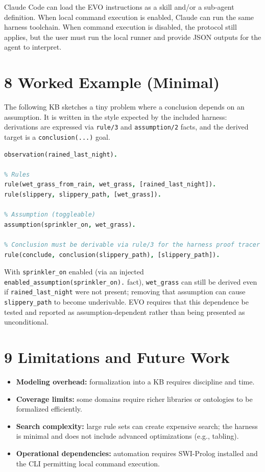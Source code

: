 \documentclass[12pt,a4paper]{article}
\begin{document}
Claude Code can load the EVO instructions as a skill and/or a sub-agent definition. When local command execution is enabled, Claude can run the same harness toolchain. When command execution is disabled, the protocol still applies, but the user must run the local runner and provide JSON outputs for the agent to interpret.

\section{8 Worked Example (Minimal)}

The following KB sketches a tiny problem where a conclusion depends on an assumption. It is written in the style expected by the included harness: derivations are expressed via \texttt{rule/3} and \texttt{assumption/2} facts, and the derived target is a \texttt{conclusion(...)} goal.

\begin{lstlisting}[language=Prolog]
% Observations
observation(rained_last_night).

% Rules
rule(wet_grass_from_rain, wet_grass, [rained_last_night]).
rule(slippery, slippery_path, [wet_grass]).

% Assumption (toggleable)
assumption(sprinkler_on, wet_grass).

% Conclusion must be derivable via rule/3 for the harness proof tracer
rule(conclude, conclusion(slippery_path), [slippery_path]).
\end{lstlisting}

With \texttt{sprinkler\_on} enabled (via an injected \texttt{enabled\_assumption(sprinkler\_on).} fact), \texttt{wet\_grass} can still be derived even if \texttt{rained\_last\_night} were not present; removing that assumption can cause \texttt{slippery\_path} to become underivable. EVO requires that this dependence be tested and reported as assumption-dependent rather than being presented as unconditional.

\section{9 Limitations and Future Work}

\begin{itemize}[leftmargin=*,topsep=2pt,itemsep=2pt]
\item \textbf{Modeling overhead:} formalization into a KB requires discipline and time.
\item \textbf{Coverage limits:} some domains require richer libraries or ontologies to be formalized efficiently.
\item \textbf{Search complexity:} large rule sets can create expensive search; the harness is minimal and does not include advanced optimizations (e.g., tabling).
\item \textbf{Operational dependencies:} automation requires SWI-Prolog installed and the CLI permitting local command execution.
\end{itemize}
\end{document}
